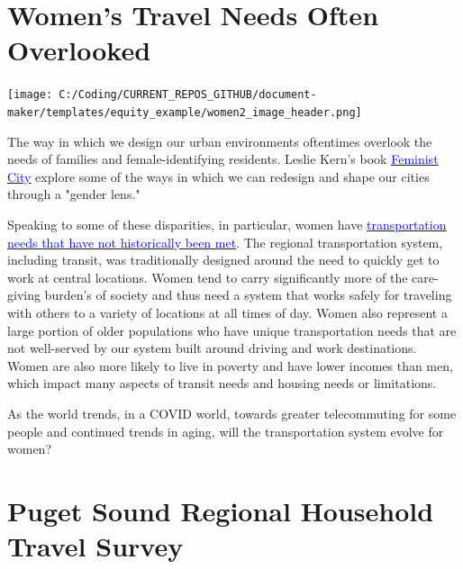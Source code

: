 \documentclass[
  12pt,
]{article}
\author{}
\date{\vspace{-2.5em}}
\begin{document}
\setmainfont{Poppins}

\hypertarget{womens-travel-needs-often-overlooked}{%
\section{Women's Travel Needs Often
Overlooked}\label{womens-travel-needs-often-overlooked}}

\texttt{[image: C:/Coding/CURRENT\_REPOS\_GITHUB/document-maker/templates/equity\_example/women2\_image\_header.png]}

\begin{flushleft}
The way in which we design our urban environments oftentimes overlook the needs of families and female-identifying residents. Leslie Kern's book \href{https://metropolismag.com/viewpoints/leslie-kern-feminist-city/}{\underline{\textcolor{blue}{Feminist City}}} explore some of the ways in which we can redesign and shape our cities through a "gender lens." \smallskip

Speaking to some of these disparities, in particular, women have \href{http://libraryarchives.metro.net/DB_Attachments/2019-0294/UnderstandingHowWomenTravel_FullReport_FINAL.pdf}{\underline{\textcolor{blue}{transportation needs that have not historically been met}}}. The regional transportation system, including transit, was traditionally designed around the need to quickly get to work at central locations. Women tend to carry significantly more of the care-giving burden's of society and thus need a system that works safely for traveling with others to a variety of locations at all times of day. Women also represent a large portion of older populations who have unique transportation needs that are not well-served by our system built around driving and work destinations. Women are also more likely to live in poverty and have lower incomes than men, which impact many aspects of transit needs and housing needs or limitations.\smallskip

As the world trends, in a COVID world, towards greater telecommuting for some people and continued trends in aging, will the transportation system evolve for women?
\end{flushleft}

\newpage
\setlength{\headheight}{10pt}
\setlength{\textheight}{665pt}
\fancyhead[L]{}

\hypertarget{puget-sound-regional-household-travel-survey}{%
\section{Puget Sound Regional Household Travel
Survey}\label{puget-sound-regional-household-travel-survey}}
\end{document}
